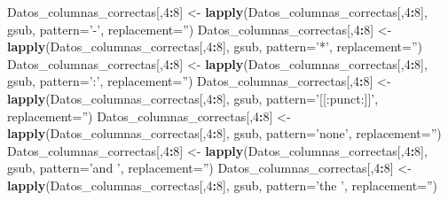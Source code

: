 \documentclass[]{article}
\newenvironment{Shaded}{\begin{snugshade}}{\end{snugshade}}
\newcommand{\KeywordTok}[1]{\textcolor[rgb]{0.13,0.29,0.53}{\textbf{#1}}}
\newcommand{\DataTypeTok}[1]{\textcolor[rgb]{0.13,0.29,0.53}{#1}}
\newcommand{\DecValTok}[1]{\textcolor[rgb]{0.00,0.00,0.81}{#1}}
\newcommand{\StringTok}[1]{\textcolor[rgb]{0.31,0.60,0.02}{#1}}
\newcommand{\OperatorTok}[1]{\textcolor[rgb]{0.81,0.36,0.00}{\textbf{#1}}}
\newcommand{\NormalTok}[1]{#1}
\begin{document}
\begin{Shaded}
\begin{Highlighting}[]
\NormalTok{Datos_columnas_correctas[,}\DecValTok{4}\OperatorTok{:}\DecValTok{8}\NormalTok{] <-}\StringTok{ }\KeywordTok{lapply}\NormalTok{(Datos_columnas_correctas[,}\DecValTok{4}\OperatorTok{:}\DecValTok{8}\NormalTok{], gsub, }\DataTypeTok{pattern=}\StringTok{'-'}\NormalTok{, }\DataTypeTok{replacement=}\StringTok{''}\NormalTok{)}
\NormalTok{Datos_columnas_correctas[,}\DecValTok{4}\OperatorTok{:}\DecValTok{8}\NormalTok{] <-}\StringTok{ }\KeywordTok{lapply}\NormalTok{(Datos_columnas_correctas[,}\DecValTok{4}\OperatorTok{:}\DecValTok{8}\NormalTok{], gsub, }\DataTypeTok{pattern=}\StringTok{'*'}\NormalTok{, }\DataTypeTok{replacement=}\StringTok{''}\NormalTok{)}
\NormalTok{Datos_columnas_correctas[,}\DecValTok{4}\OperatorTok{:}\DecValTok{8}\NormalTok{] <-}\StringTok{ }\KeywordTok{lapply}\NormalTok{(Datos_columnas_correctas[,}\DecValTok{4}\OperatorTok{:}\DecValTok{8}\NormalTok{], gsub, }\DataTypeTok{pattern=}\StringTok{':'}\NormalTok{, }\DataTypeTok{replacement=}\StringTok{''}\NormalTok{)}
\NormalTok{Datos_columnas_correctas[,}\DecValTok{4}\OperatorTok{:}\DecValTok{8}\NormalTok{] <-}\StringTok{ }\KeywordTok{lapply}\NormalTok{(Datos_columnas_correctas[,}\DecValTok{4}\OperatorTok{:}\DecValTok{8}\NormalTok{], gsub, }\DataTypeTok{pattern=}\StringTok{'[[:punct:]]'}\NormalTok{, }\DataTypeTok{replacement=}\StringTok{''}\NormalTok{)}
\NormalTok{Datos_columnas_correctas[,}\DecValTok{4}\OperatorTok{:}\DecValTok{8}\NormalTok{] <-}\StringTok{ }\KeywordTok{lapply}\NormalTok{(Datos_columnas_correctas[,}\DecValTok{4}\OperatorTok{:}\DecValTok{8}\NormalTok{], gsub, }\DataTypeTok{pattern=}\StringTok{'none'}\NormalTok{, }\DataTypeTok{replacement=}\StringTok{''}\NormalTok{)}
\NormalTok{Datos_columnas_correctas[,}\DecValTok{4}\OperatorTok{:}\DecValTok{8}\NormalTok{] <-}\StringTok{ }\KeywordTok{lapply}\NormalTok{(Datos_columnas_correctas[,}\DecValTok{4}\OperatorTok{:}\DecValTok{8}\NormalTok{], gsub, }\DataTypeTok{pattern=}\StringTok{'and '}\NormalTok{, }\DataTypeTok{replacement=}\StringTok{''}\NormalTok{)}
\NormalTok{Datos_columnas_correctas[,}\DecValTok{4}\OperatorTok{:}\DecValTok{8}\NormalTok{] <-}\StringTok{ }\KeywordTok{lapply}\NormalTok{(Datos_columnas_correctas[,}\DecValTok{4}\OperatorTok{:}\DecValTok{8}\NormalTok{], gsub, }\DataTypeTok{pattern=}\StringTok{'the '}\NormalTok{, }\DataTypeTok{replacement=}\StringTok{''}\NormalTok{)}


\end{Highlighting}
\end{Shaded}
\end{document}
